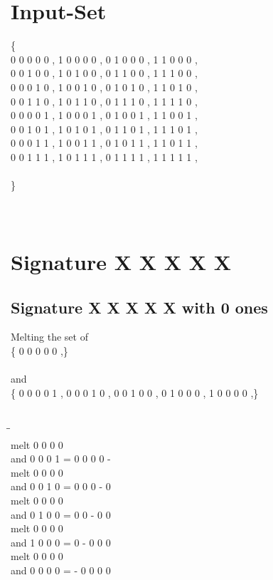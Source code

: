 \documentclass{article}
\begin{document}
\newpage
\section{Input-Set}\{\\ 0  0  0  0  0 , 1  0  0  0  0 , 0  1  0  0  0 , 1  1  0  0  0 ,\\ 0  0  1  0  0 , 1  0  1  0  0 , 0  1  1  0  0 , 1  1  1  0  0 ,\\ 0  0  0  1  0 , 1  0  0  1  0 , 0  1  0  1  0 , 1  1  0  1  0 ,\\ 0  0  1  1  0 , 1  0  1  1  0 , 0  1  1  1  0 , 1  1  1  1  0 ,\\ 0  0  0  0  1 , 1  0  0  0  1 , 0  1  0  0  1 , 1  1  0  0  1 ,\\ 0  0  1  0  1 , 1  0  1  0  1 , 0  1  1  0  1 , 1  1  1  0  1 ,\\ 0  0  0  1  1 , 1  0  0  1  1 , 0  1  0  1  1 , 1  1  0  1  1 ,\\ 0  0  1  1  1 , 1  0  1  1  1 , 0  1  1  1  1 , 1  1  1  1  1 ,\\\\ \} \\\\
\\
\newpage
\section{Signature X X X X X }
\subsection{Signature X X X X X with 0 ones}
Melting the set of\\
\{ 0  0  0  0  0 ,\}\\\\
and\\
\{ 0  0  0  0  1 , 0  0  0  1  0 , 0  0  1  0  0 , 0  1  0  0  0 , 1  0  0  0  0 ,\}\\\\
\begin{tabbing}
\hspace{3cm}\=\hspace{3cm}\=\hspace{3cm}\\[1cm]
melt  0  0  0  0 \\
and  0  0  0  1 \>
 =  0  0  0  0  - \\[1mm]
melt  0  0  0  0 \\
and  0  0  1  0 \>
 =  0  0  0  -  0 \\[1mm]
melt  0  0  0  0 \\
and  0  1  0  0 \>
 =  0  0  -  0  0 \\[1mm]
melt  0  0  0  0 \\
and  1  0  0  0 \>
 =  0  -  0  0  0 \\[1mm]
melt  0  0  0  0 \\
and  0  0  0  0 \>
 =  -  0  0  0  0 \\[1mm]
\end{tabbing}
\newpage
\end{document}
